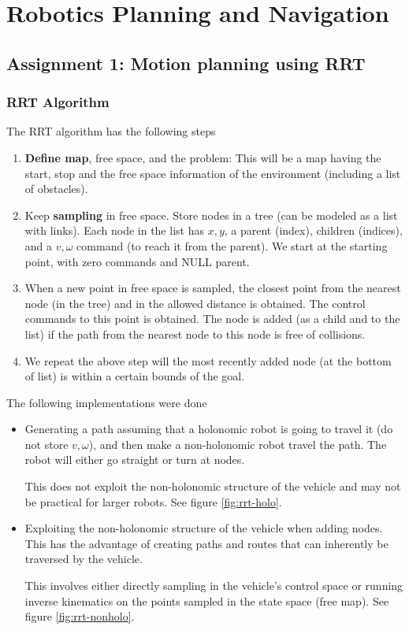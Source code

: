 \section{Robotics Planning and Navigation}

\subsection{Assignment 1: Motion planning using RRT}

\subsubsection*{RRT Algorithm}

The RRT algorithm has the following steps

\begin{enumerate}
    \item \textbf{Define map}, free space, and the problem: This will be a map having the start, stop and the free space information of the environment (including a list of obstacles).
    \item Keep \textbf{sampling} in free space. Store nodes in a tree (can be modeled as a list with links). Each node in the list has $x, y$, a parent (index), children (indices), and a $v, \omega$ command (to reach it from the parent). We start at the starting point, with zero commands and NULL parent.
    \item When a new point in free space is sampled, the closest point from the nearest node (in the tree) and in the allowed distance is obtained. The control commands to this point is obtained. The node is added (as a child and to the list) if the path from the nearest node to this node is free of collisions.
    \item We repeat the above step will the most recently added node (at the bottom of list) is within a certain bounds of the goal.
\end{enumerate}

The following implementations were done

\begin{itemize}
    \item Generating a path assuming that a holonomic robot is going to travel it (do not store $v, \omega$), and then make a non-holonomic robot travel the path. The robot will either go straight or turn at nodes.
    
    This does not exploit the non-holonomic structure of the vehicle and may not be practical for larger robots. See figure \ref{fig:rrt-holo}.

    \item Exploiting the non-holonomic structure of the vehicle when adding nodes. This has the advantage of creating paths and routes that can inherently be traversed by the vehicle.
    
    This involves either directly sampling in the vehicle's control space or running inverse kinematics on the points sampled in the state space (free map). See figure \ref{fig:rrt-nonholo}.
\end{itemize}

